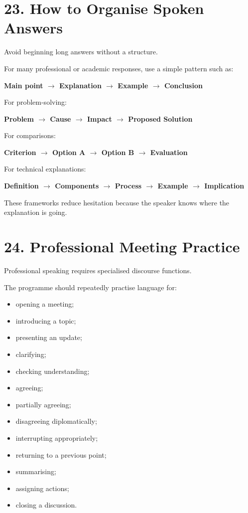 \section*{23. How to Organise Spoken Answers}

Avoid beginning long answers without a structure.

For many professional or academic responses, use a simple pattern such as:

\begin{center}
\textbf{Main point $\rightarrow$ Explanation $\rightarrow$ Example $\rightarrow$ Conclusion}
\end{center}

For problem-solving:

\begin{center}
\textbf{Problem $\rightarrow$ Cause $\rightarrow$ Impact $\rightarrow$ Proposed Solution}
\end{center}

For comparisons:

\begin{center}
\textbf{Criterion $\rightarrow$ Option A $\rightarrow$ Option B $\rightarrow$ Evaluation}
\end{center}

For technical explanations:

\begin{center}
\textbf{Definition $\rightarrow$ Components $\rightarrow$ Process $\rightarrow$ Example $\rightarrow$ Implication}
\end{center}

These frameworks reduce hesitation because the speaker knows where the explanation is going.

\section*{24. Professional Meeting Practice}

Professional speaking requires specialised discourse functions.

The programme should repeatedly practise language for:

\begin{itemize}
    \item opening a meeting;
    \item introducing a topic;
    \item presenting an update;
    \item clarifying;
    \item checking understanding;
    \item agreeing;
    \item partially agreeing;
    \item disagreeing diplomatically;
    \item interrupting appropriately;
    \item returning to a previous point;
    \item summarising;
    \item assigning actions;
    \item closing a discussion.
\end{itemize}

